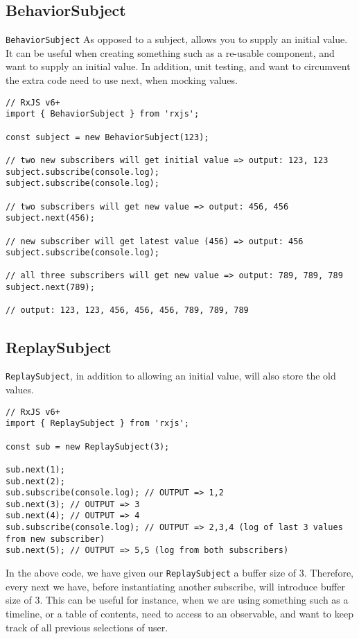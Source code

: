 \subsection{BehaviorSubject}
\lstinline{BehaviorSubject} As opposed to a subject, allows you to supply an 
initial value. It can be useful when creating something such as a re-usable 
component, and want to supply an initial value. In addition, unit testing, 
and want to circumvent the extra code need to use next, when mocking values. 
\begin{lstlisting}
// RxJS v6+
import { BehaviorSubject } from 'rxjs';

const subject = new BehaviorSubject(123);

// two new subscribers will get initial value => output: 123, 123
subject.subscribe(console.log);
subject.subscribe(console.log);

// two subscribers will get new value => output: 456, 456
subject.next(456);

// new subscriber will get latest value (456) => output: 456
subject.subscribe(console.log);

// all three subscribers will get new value => output: 789, 789, 789
subject.next(789);

// output: 123, 123, 456, 456, 456, 789, 789, 789  
\end{lstlisting}

\subsection{ReplaySubject}
\lstinline{ReplaySubject}, in addition to allowing an initial value, will also 
store the old values. 
\begin{lstlisting}
// RxJS v6+
import { ReplaySubject } from 'rxjs';

const sub = new ReplaySubject(3);

sub.next(1);
sub.next(2);
sub.subscribe(console.log); // OUTPUT => 1,2
sub.next(3); // OUTPUT => 3
sub.next(4); // OUTPUT => 4
sub.subscribe(console.log); // OUTPUT => 2,3,4 (log of last 3 values from new subscriber)
sub.next(5); // OUTPUT => 5,5 (log from both subscribers)  
\end{lstlisting}

In the above code, we have given our \lstinline{ReplaySubject} a buffer size of
3. Therefore, every next we have, before instantiating another subscribe, will 
introduce buffer size of 3. This can be useful for instance, when we are using something 
such as a timeline, or a table of contents, need to access to an observable, and want to 
keep track of all previous selections of user. 

